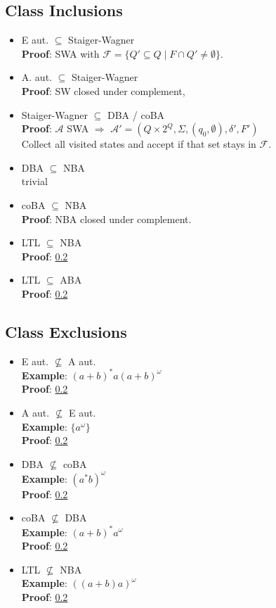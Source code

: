\documentclass{article}
\begin{document}
\subsection{Class Inclusions}
\begin{itemize}
	\item E aut. $\subseteq$ Staiger-Wagner \\
		\textbf{Proof}: SWA with $\mathcal{F} = \{ Q' \subseteq Q \mid F \cap Q' \neq \emptyset \}$.
    \item A. aut. $\subseteq$ Staiger-Wagner \\
    	\textbf{Proof}: SW closed under complement,
    \item Staiger-Wagner $\subseteq$ DBA / coBA \\
    	\textbf{Proof}: $\mathcal{A}$ SWA $\Rightarrow$ $\mathcal{A}' = (Q \times 2^Q, \Sigma, (q_0, \emptyset), \delta', F')$ \\
    	Collect all visited states and accept if that set stays in $\mathcal{F}$.
    \item DBA $\subseteq$ NBA \\
    	trivial
    \item coBA $\subseteq$ NBA \\
    	\textbf{Proof}: NBA closed under complement.
    \item LTL $\subseteq$ NBA \\
    	\textbf{Proof}: \ref{} %
    \item LTL $\subseteq$ ABA \\
    	\textbf{Proof}: \ref{} %
\end{itemize}

\subsection{Class Exclusions}
\begin{itemize}
	\item E aut. $\not\subseteq$ A aut. \\
		\textbf{Example}: $(a+b)^* a (a+b)^\omega$ \\
    	\textbf{Proof}: \ref{} %
	\item A aut. $\not\subseteq$ E aut. \\
		\textbf{Example}: $\{a^\omega\}$ \\
    	\textbf{Proof}: \ref{} %
	\item DBA $\not\subseteq$ coBA \\
		\textbf{Example}: $(a^*b)^\omega$ \\
    	\textbf{Proof}: \ref{} %
	\item coBA $\not\subseteq$ DBA \\
		\textbf{Example}: $(a+b)^* a^\omega$ \\
    	\textbf{Proof}: \ref{} %
	\item LTL $\not\subseteq$ NBA \\
		\textbf{Example}: $((a+b) a)^\omega$ \\
    	\textbf{Proof}: \ref{} %
\end{itemize}
\end{document}
